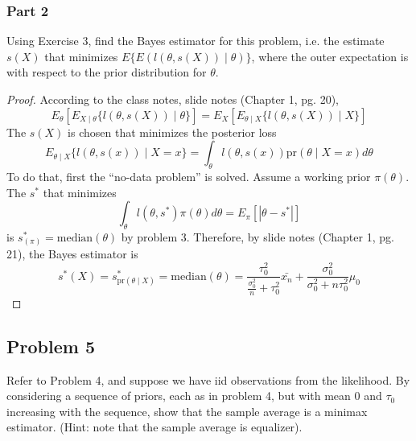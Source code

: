 \documentclass[letterpaper, 12pt]{article}\usepackage[]{graphicx}\usepackage[]{color}
\newcommand{\pr}{\text{pr}}
\newcommand{\sbs}{\;|\;} %
\begin{document}
\subsubsection*{Part 2}
Using Exercise 3, find the Bayes estimator for this problem, i.e. the estimate $s(X)$ that minimizes $E \{E (l ( \theta, s(X)) \sbs \theta  ) \}$, where the outer expectation is with respect to the prior distribution for $\theta$.
\begin{proof}
According to the class notes, slide notes (Chapter 1, pg. 20),
\begin{equation}
E_\theta [E_{X\sbs\theta} \{l ( \theta, s(X)) \sbs \theta  \} ]=
E_{X} [E_{\theta\sbs X} \{l ( \theta, s(X)) \sbs X  \} ]
\end{equation}
The $s(X)$ is chosen that minimizes the posterior loss
\begin{equation}
E_{\theta\sbs X} \{l ( \theta, s(x)) \sbs X =x \}
=
\int_\theta 
l(\theta, s(x)) \pr(\theta \sbs X=x)d\theta
\end{equation}
To do that, first the ``no-data problem'' is solved. Assume a working prior $\pi(\theta)$. The $s^*$ that minimizes 
\begin{equation}
\int_\theta 
l(\theta, s^*) \pi(\theta)d\theta = E_\pi [|\theta - s^*|]
\end{equation}
is $s^*_{(\pi)} = \text{median}(\theta)$ by problem 3. Therefore, by slide notes (Chapter 1, pg. 21), the Bayes estimator is
\[
s^*(X) = s^*_{\pr(\theta \sbs X)} = \text{median}(\theta) = \frac{\tau_0^2}{\frac{\sigma_0^2}{n}+ \tau_0^2} \bar{x_n} +
\frac{\sigma_0^2}{\sigma_0^2+ n\tau_0^2} \mu_0
\]
\end{proof}

\subsection*{Problem 5}
Refer to Problem 4, and suppose we have iid observations from the likelihood. By considering a sequence of priors, each as in problem 4, but with mean $0$ and $\tau_0$ increasing with the sequence, show that the sample average is a minimax estimator. (Hint: note that the sample average is equalizer).
\end{document}

